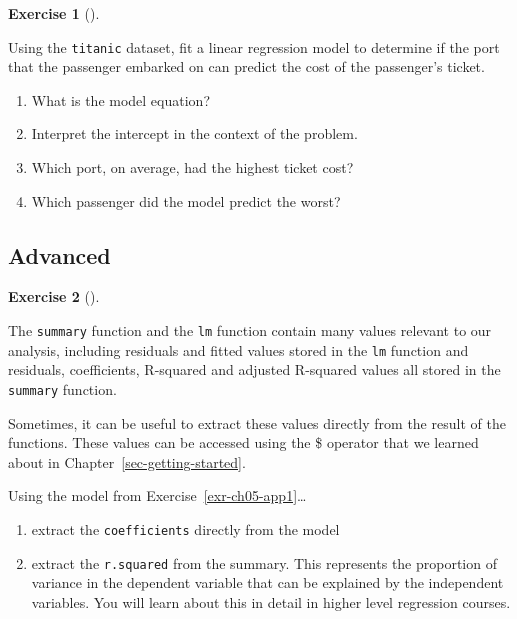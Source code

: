 \documentclass[
  letterpaper,
  DIV=11,
  numbers=noendperiod]{scrreprt}
\providecommand{\tightlist}{%
  \setlength{\itemsep}{0pt}\setlength{\parskip}{0pt}}\usepackage{longtable,booktabs,array}
\theoremstyle{definition}
\newtheorem{exercise}{Exercise}[chapter]
\theoremstyle{remark}
\begin{document}
\leavevmode{}%
\begin{exercise}[]\label{exr-ch05-app3}

Using the \texttt{titanic} dataset, fit a linear regression model to
determine if the port that the passenger embarked on can predict the
cost of the passenger's ticket.

\begin{enumerate}
\def\labelenumi{\alph{enumi})}
\tightlist
\item
  What is the model equation?
\item
  Interpret the intercept in the context of the problem.
\item
  Which port, on average, had the highest ticket cost?
\item
  Which passenger did the model predict the worst?
\end{enumerate}

\end{exercise}

\hypertarget{sec-ex05-advanced}{%
\subsection{Advanced}\label{sec-ex05-advanced}}

\leavevmode{}%
\begin{exercise}[]\label{exr-ch05-adv1}

The \texttt{summary} function and the \texttt{lm} function contain many
values relevant to our analysis, including residuals and fitted values
stored in the \texttt{lm} function and residuals, coefficients,
R-squared and adjusted R-squared values all stored in the
\texttt{summary} function.

Sometimes, it can be useful to extract these values directly from the
result of the functions. These values can be accessed using the \$
operator that we learned about in Chapter~\ref{sec-getting-started}.

Using the model from Exercise~\ref{exr-ch05-app1}\ldots{}

\begin{enumerate}
\def\labelenumi{\alph{enumi})}
\tightlist
\item
  extract the \texttt{coefficients} directly from the model
\item
  extract the \texttt{r.squared} from the summary. This represents the
  proportion of variance in the dependent variable that can be explained
  by the independent variables. You will learn about this in detail in
  higher level regression courses.
\end{enumerate}

\end{exercise}
\end{document}
